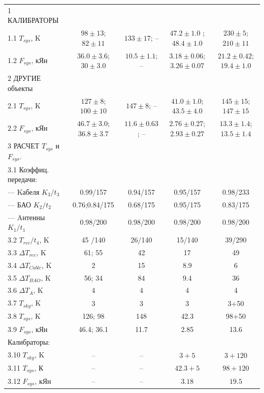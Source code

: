 \begin{table}
\begin{SingleSpace}
\begin{tabular}{lcccc}
        \midrule
1 КАЛИБРАТОРЫ              & & & &\\
1.1 $T_{sys}$, K    & $98\pm13$; $82\pm11$    & $133\pm17$; --  &
$47.2\pm1.0$ ; $48.4\pm1.0$  & $230\pm5$; $210\pm11$ \\
1.2 $F_{sys}$, кЯн  & $36.0\pm3.6$; $30\pm3.0$ & $10.5\pm1.1$; -- & $3.18\pm0.06$; $3.26\pm0.07$
& $21.2\pm0.42$; $19.4\pm1.0$\\
2 ДРУГИЕ объекты         & & & &\\
2.1 $T_{sys}$, K    & $127\pm8$; $100\pm10$      & $147\pm8$; --  & $41.0\pm1.0$; $43.5\pm4.0$
& $145\pm15$; $147\pm15$\\
2.2 $F_{sys}$, кЯн  & $46.7\pm3.0$; $36.8\pm3.7$ & $11.6\pm0.63$; -- & $2.76\pm0.27$; $2.93\pm0.27$
& $13.3\pm1.4$; $13.5\pm1.4$\\
\midrule
3 РАСЧЕТ $T_{sys}$ и $F_{sys}$.& & & &\\
3.1 Коэффиц. передачи: & & & &\\
--- Kабеля $K_3/t_3$  &  0.99/157      & 0.94/157        & 0.95/157       & 0.98/233 \\
--- БАО $K_2/t_2$     &  0.76;0.84/175 & 0.68/175        & 0.95/175       & 0.83/175 \\
--- Aнтенны $K_1/t_1$ &  0.98/200      & 0.98/200        & 0.98/200       & 0.98/200 \\
3.2 $T_{rec} / t_4$, K   & 45 /140 & 26/140 & 15/140 & 39/290\\
3.3 $\Delta T_{rec}$, K  & 61; 55     & 42     & 17     & 49    \\
3.4 $\Delta T_{Cable}$, K&  2         & 15     & 8.9    &  6    \\
3.5 $\Delta T_{BAO}$, K  & 56; 34     & 84     & 9.4    & 36    \\
3.6 $\Delta T_A$, K      & 4          &  4     & 4      &  4    \\
3.7 $T_{sky}$, K         & 3          &  3     & 3      &  3+50 \\
3.8 $T_{sys}$, K         & 126; 98    & 148    & 42.3   &  98+50\\
3.9 $F_{sys}$, кЯн     & 46.4; 36.1& 11.7& 2.85   & 13.6  \\
Калибраторы: & & & & \\
3.10 $T_{sky}$, K         &    --       &  --     & $3+5$    &  $3+120$  \\
3.11 $T_{sys}$, К         &    --       &  --     & $42.3+5$ &  $98+120$ \\
3.12 $F_{sys}$, кЯн       &    --       &  --     & $3.18$   &  $19.5$    \\
        \bottomrule
        \end{tabular}
    \end{SingleSpace}
\end{table}

